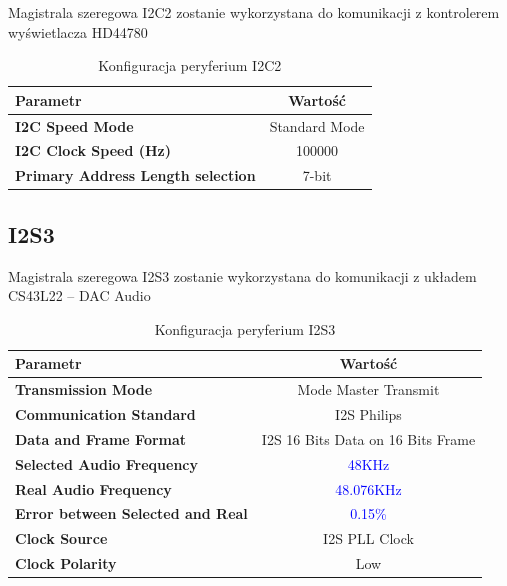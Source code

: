 \documentclass[10pt, a4paper]{article}
\begin{document}
Magistrala szeregowa I2C2 zostanie wykorzystana do komunikacji z kontrolerem wyświetlacza HD44780 

\begin{table}[H]
	\centering
	\begin{tabular}{|l|c|} \hline
		\textbf{Parametr} & Wartość \\
		\hline
		\hline  \textbf{I2C Speed Mode}& Standard Mode \\  \hline
		\textbf{I2C Clock Speed (Hz) } & 100000 \\
		
		\hline  \textbf{Primary Address Length selection}& 7-bit  \\\hline

	\end{tabular}
	\caption{Konfiguracja peryferium I2C2}
	\label{tab:USART}
\end{table}
\subsection{I2S3}

Magistrala szeregowa I2S3 zostanie wykorzystana do komunikacji z układem CS43L22 -- DAC Audio 

\begin{table}[H]
	\centering
	\begin{tabular}{|l|c|} \hline
		\textbf{Parametr} & Wartość \\
		\hline
		\hline  \textbf{Transmission Mode}& Mode Master Transmit \\ 
		\hline  \textbf{Communication Standard} & I2S Philips \\
		\hline  \textbf{Data and Frame Format} & I2S 16 Bits Data on 16 Bits Frame \\
		\hline  \textbf{Selected Audio Frequency} & \textcolor{blue}{48KHz }\\
		\hline  \textbf{Real Audio Frequency} & \textcolor{blue}{48.076KHz} \\
		\hline  \textbf{Error between Selected and Real} & \textcolor{blue}{0.15{\%}}
		\\
	\hline  \textbf{Clock Source} & I2S PLL Clock  \\
	\hline  \textbf{Clock Polarity} & Low \\
	\hline

	\end{tabular}
	\caption{Konfiguracja peryferium I2S3}
	\label{tab:USART}
\end{table}
\end{document}
